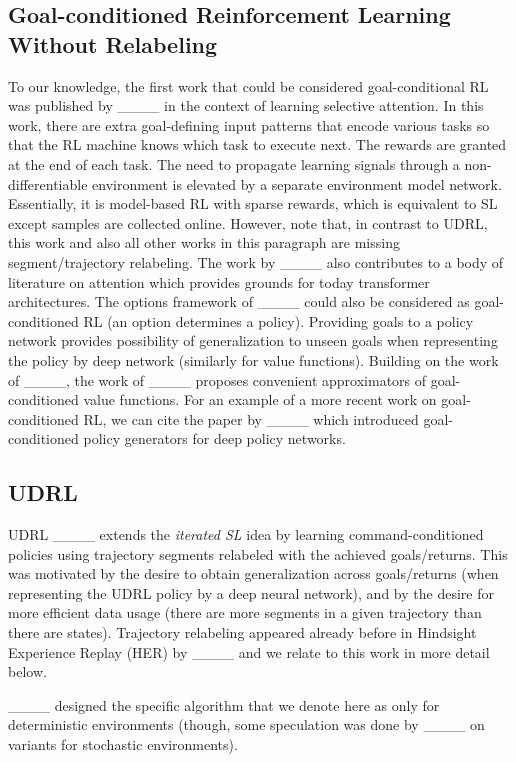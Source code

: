 \subsection{Goal-conditioned Reinforcement Learning Without Relabeling}
\label{sec:rw:gcrl}

To our knowledge, the first work that could be considered goal-conditional RL was published
by 
____ in the context of learning selective attention.
In this work, there are extra goal-defining input patterns that encode various tasks so that the RL machine knows which task to execute next.
The rewards are granted at the end of each task.
The need to propagate learning signals through a non-differentiable
environment is elevated by a separate environment model network.
Essentially, it is model-based RL with sparse rewards, which is equivalent to SL except samples are collected online.
However, note that, in contrast to UDRL, this work and also all other works in this paragraph are missing segment/trajectory relabeling.
The work by ____
also contributes to a body of literature on attention which provides grounds for today transformer architectures.
The options framework of ____ could also be considered as goal-conditioned RL (an option determines a policy).
Providing goals to a policy network provides possibility of generalization to unseen goals when representing the policy by deep network (similarly for value functions).
Building on the work of ____, the work of ____ proposes convenient approximators of goal-conditioned value functions.
For an example of a more recent work on goal-conditioned RL, we can cite the paper by ____ which introduced goal-conditioned policy generators for deep policy networks.%


\subsection{UDRL}
\label{sec:rw:udrl}

UDRL ____ extends the \emph{iterated SL} idea by
learning command-conditioned policies using
trajectory segments relabeled with the achieved goals/returns.
This was motivated by the desire to obtain
generalization across goals/returns (when representing the UDRL policy by
a deep neural network), and by the desire for
more efficient data usage (there are more segments in a given trajectory than there are states).
Trajectory relabeling appeared already before in Hindsight Experience Replay (HER) by ____ and we relate to this work in more detail below.

____ designed the specific algorithm
that we denote here as \eUDRL{} only for deterministic environments
(though, some speculation was done by ____ on variants for stochastic environments).

